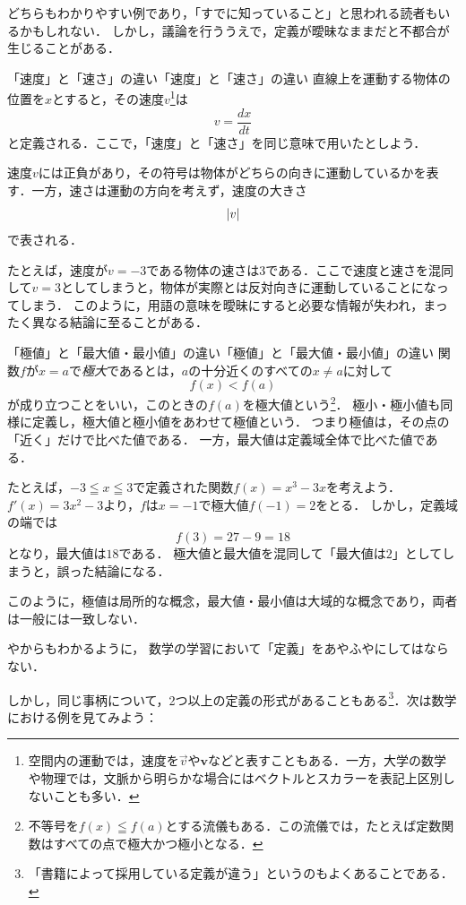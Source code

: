 どちらもわかりやすい例であり，「すでに知っていること」と思われる読者もいるかもしれない．
しかし，議論を行ううえで，定義が曖昧なままだと不都合が生じることがある．

\begin{example}{「速度」と「速さ」の違い}{「速度」と「速さ」の違い}
直線上を運動する物体の位置を$x$とすると，その速度$v$\footnote{空間内の運動では，速度を$\vec{v}$や$\bm{v}$などと表すこともある．一方，大学の数学や物理では，文脈から明らかな場合にはベクトルとスカラーを表記上区別しないことも多い．}は
\[
v=\frac{dx}{dt}
\]
と定義される．ここで，「速度」と「速さ」を同じ意味で用いたとしよう．

速度$v$には正負があり，その符号は物体がどちらの向きに運動しているかを表す．一方，速さは運動の方向を考えず，速度の大きさ
\[
\lvert v\rvert
\]
で表される．

たとえば，速度が$v=-3$である物体の速さは$3$である．ここで速度と速さを混同して$v=3$としてしまうと，物体が実際とは反対向きに運動していることになってしまう．
このように，用語の意味を曖昧にすると必要な情報が失われ，まったく異なる結論に至ることがある．
\end{example}

\begin{example}{「極値」と「最大値・最小値」の違い}{「極値」と「最大値・最小値」の違い}
  関数$f$が$x=a$で\emph{極大}であるとは，$a$の十分近くのすべての$x\neq a$に対して
  \[
    f(x)<f(a)
  \]
  が成り立つことをいい，このときの$f(a)$を極大値という\footnote{不等号を$f(x)\leqq f(a)$とする流儀もある．この流儀では，たとえば定数関数はすべての点で極大かつ極小となる．}．
  極小・極小値も同様に定義し，極大値と極小値をあわせて極値という．
  つまり極値は，その点の「近く」だけで比べた値である．
  一方，最大値は定義域全体で比べた値である．

  たとえば，$-3\leqq x\leqq 3$で定義された関数$f(x)=x^3-3x$を考えよう．
  $f'(x)=3x^2-3$より，$f$は$x=-1$で極大値$f(-1)=2$をとる．
  しかし，定義域の端では
  \[
    f(3)=27-9=18
  \]
  となり，最大値は$18$である．
  極大値と最大値を混同して「最大値は$2$」としてしまうと，誤った結論になる．

  このように，極値は局所的な概念，最大値・最小値は大域的な概念であり，両者は一般には一致しない．
\end{example}

やからもわかるように，
数学の学習において「定義」をあやふやにしてはならない．

しかし，同じ事柄について，2つ以上の定義の形式があることもある\footnote{「書籍によって採用している定義が違う」というのもよくあることである．}．次は数学における例を見てみよう：

